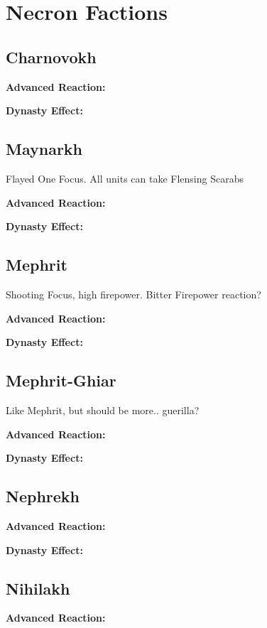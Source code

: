 \section{Necron Factions}

\subsection{Charnovokh}

\textbf{Advanced Reaction:}

\textbf{Dynasty Effect:}


\subsection{Maynarkh}

Flayed One Focus. All units can take Flensing Scarabs

\textbf{Advanced Reaction:}

\textbf{Dynasty Effect:}


\subsection{Mephrit}

Shooting Focus, high firepower. Bitter Firepower reaction?

\textbf{Advanced Reaction:}

\textbf{Dynasty Effect:}


\subsection{Mephrit-Ghiar}

Like Mephrit, but should be more.. guerilla?

\textbf{Advanced Reaction:}

\textbf{Dynasty Effect:}


\subsection{Nephrekh}

\textbf{Advanced Reaction:}

\textbf{Dynasty Effect:}


\subsection{Nihilakh}

\textbf{Advanced Reaction:}

